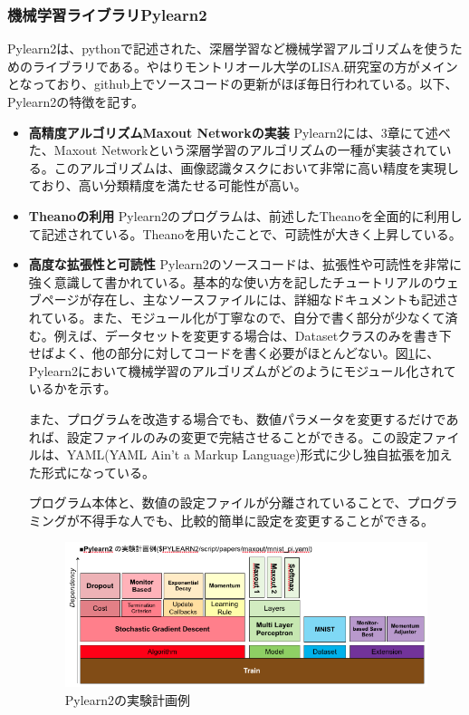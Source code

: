 \subsubsection{機械学習ライブラリPylearn2}
Pylearn2は、pythonで記述された、深層学習など機械学習アルゴリズムを使うためのライブラリである\cite{goodfellow2013Pylearn2:}。やはりモントリオール大学のLISA.研究室の方がメインとなっており、github上でソースコードの更新がほぼ毎日行われている。以下、Pylearn2の特徴を記す。
\begin{itemize}
\item \textbf{高精度アルゴリズムMaxout Networkの実装}
Pylearn2には、3章にて述べた、Maxout Networkという深層学習のアルゴリズムの一種が実装されている。このアルゴリズムは、画像認識タスクにおいて非常に高い精度を実現しており、高い分類精度を満たせる可能性が高い。
\item \textbf{Theanoの利用}
Pylearn2のプログラムは、前述したTheanoを全面的に利用して記述されている。Theanoを用いたことで、可読性が大きく上昇している。
\item \textbf{高度な拡張性と可読性}
Pylearn2のソースコードは、拡張性や可読性を非常に強く意識して書かれている。基本的な使い方を記したチュートリアルのウェブページが存在し、主なソースファイルには、詳細なドキュメントも記述されている。また、モジュール化が丁寧なので、自分で書く部分が少なくて済む。例えば、データセットを変更する場合は、Datasetクラスのみを書き下せばよく、他の部分に対してコードを書く必要がほとんどない。図\ref{c4_Pylearn2_yaml}に、Pylearn2において機械学習のアルゴリズムがどのようにモジュール化されているかを示す。\par
また、プログラムを改造する場合でも、数値パラメータを変更するだけであれば、設定ファイルのみの変更で完結させることができる。この設定ファイルは、YAML(YAML Ain't a Markup Language)形式に少し独自拡張を加えた形式になっている。\par
プログラム本体と、数値の設定ファイルが分離されていることで、プログラミングが不得手な人でも、比較的簡単に設定を変更することができる。\par
\begin{figure}[tbp]
 \begin{center}
  \includegraphics[width=120mm]{img/c4/Pylearn2_yaml}
 \end{center}
 \caption{Pylearn2の実験計画例}
 \label{c4_Pylearn2_yaml}
\end{figure}
\end{itemize}
